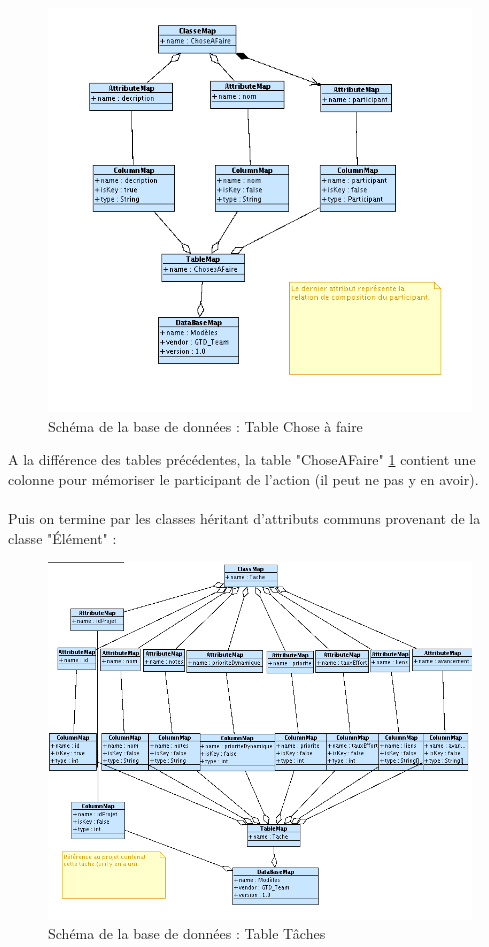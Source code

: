 \begin{figure}[htbp]

		\includegraphics[width=18cm]{images/L4/ChoseDBS.png}
	\caption{Schéma de la base de données : Table Chose à faire}
	\label{ChoseDBS}
\end{figure}
A la différence des tables précédentes, la table "ChoseAFaire" \ref{ChoseDBS} contient une colonne pour mémoriser le participant de l'action (il peut ne pas y en avoir).\\

\paragraph*{}
Puis on termine par les classes héritant d'attributs communs provenant de la classe "Élément" :\\

\begin{figure}[htbp]

		\includegraphics[width=18cm]{images/L4/TacheDBS.png}
	\caption{Schéma de la base de données : Table Tâches}
	\label{TacheDBS}
\end{figure}
